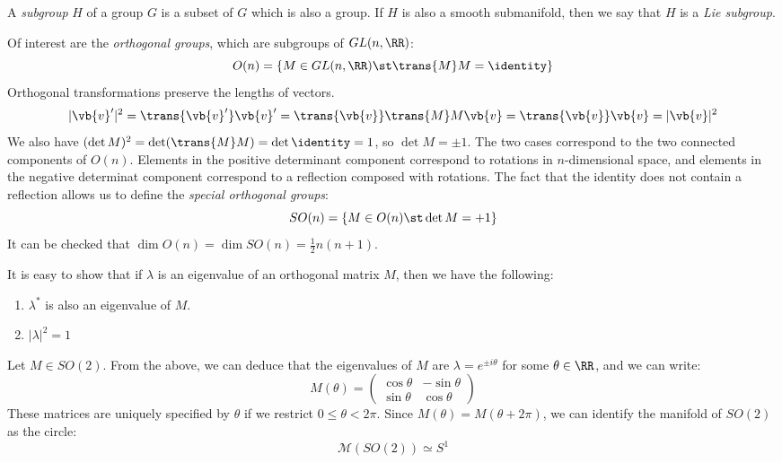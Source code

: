 \documentclass{jknotes}
\begin{document}
\begin{defn}
    A \emph{subgroup} \(H\) of a group \(G\) is a subset of \(G\) which is also a group. If \(H\) is also a smooth submanifold, then we say that \(H\) is a \emph{Lie subgroup}.
\end{defn}

Of interest are the \emph{orthogonal groups}, which are subgroups of \(GL(n,\RR)\):
\begin{equation}
    O(n) = \{M \in GL(n,\RR) \st \trans{M}M = \identity\}
\end{equation}
Orthogonal transformations preserve the lengths of vectors.
\begin{equation}
    |\vb{v}'|^2 = \trans{\vb{v}'}\vb{v}' = \trans{\vb{v}}\trans{M}M\vb{v} = \trans{\vb{v}}\vb{v} = |\vb{v}|^2
\end{equation}
We also have \((\det M)^2 = \det (\trans{M} M) = \det \identity = 1\), so \(\det M = \pm 1\). The two cases correspond to the two connected components of \(O(n)\). Elements in the positive determinant component correspond to rotations in \(n\)-dimensional space, and elements in the negative determinat component correspond to a reflection composed with rotations. The fact that the identity does not contain a reflection allows us to define the \emph{special orthogonal groups}:
\begin{equation}
    SO(n) = \{M \in O(n) \st \det M = + 1 \}
\end{equation}
It can be checked that \(\dim O(n) = \dim SO(n) = \frac{1}{2}n(n+1)\).

It is easy to show that if \(\lambda\) is an eigenvalue of an orthogonal matrix \(M\), then we have the following:
\begin{enumerate}[label=(\roman*)]
    \item \(\lambda^*\) is also an eigenvalue of \(M\).
    \item \(|\lambda|^2 = 1\)
\end{enumerate}

\begin{eg}
    Let \(M \in SO(2)\). From the above, we can deduce that the eigenvalues of \(M\) are \(\lambda = e^{\pm i\theta}\) for some \(\theta \in \RR\), and we can write:
    \begin{equation}
        M(\theta) =
        \begin{pmatrix}
            \cos\theta & - \sin\theta \\
            \sin\theta & \cos\theta
        \end{pmatrix}
    \end{equation}
    These matrices are uniquely specified by \(\theta\) if we restrict \(0 \le \theta < 2\pi\). Since \(M(\theta) = M(\theta+2\pi)\), we can identify the manifold of \(SO(2)\) as the circle:
    \begin{equation}
        \mathcal{M}(SO(2)) \simeq S^1
    \end{equation}
\end{eg}
\end{document}
